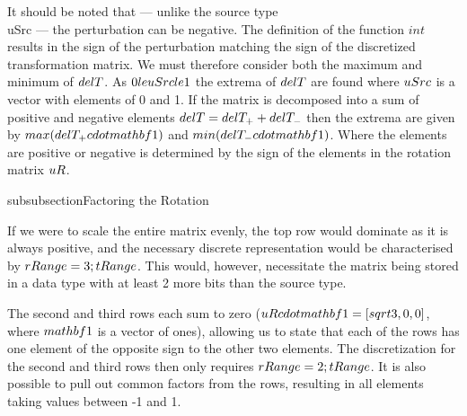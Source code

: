 It should be noted that --- unlike the source type \\uSrc --- the perturbation can be negative. The definition of the function $int$ results in the sign of the perturbation matching the sign of the discretized transformation matrix. We must therefore consider both the maximum and minimum of $\\delT$. As $0 \\le\\uSrc \\le 1$ the extrema of $\\delT$ are found where $\\uSrc$ is a vector with elements of 0 and 1. If the matrix is decomposed into a sum of positive and negative elements $\\delT = \\delT_+ + \\delT_-$ then the extrema are given by $\\max(\\delT_+ \\cdot \\mathbf{1})$ and $\\min(\\delT_- \\cdot \\mathbf{1})$. Where the elements are positive or negative is determined by the sign of the elements in the rotation matrix $\\uR$.

subsubsection{Factoring the Rotation}

If we were to scale the entire matrix evenly, the top row would dominate as it is always positive, and the necessary discrete representation would be characterised by $\\rRange = 3 \\; \\tRange$. This would, however, necessitate the matrix being stored in a data type with at least 2 more bits than the source type.

The second and third rows each sum to zero ($\\uR \\cdot \\mathbf{1} = [\\sqrt{3},0,0]$, where $\\mathbf{1}$ is a vector of ones), allowing us to state that each of the rows has one element of the opposite sign to the other two elements. The discretization for the second and third rows then only requires $\\rRange = 2 \\; \\tRange$. It is also possible to pull out common factors from the rows, resulting in all elements taking values between -1 and 1.

